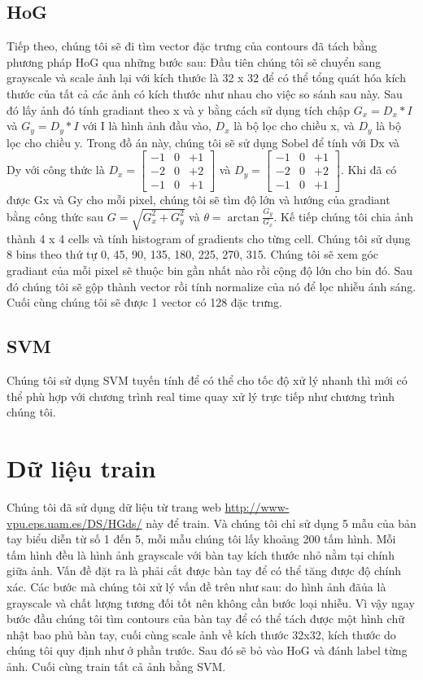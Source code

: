 \documentclass[a4paper, 12pt]{article}
\begin{document}
\subsection{HoG}
Tiếp theo, chúng tôi sẽ đi tìm vector đặc trưng của contours đã tách bằng phương pháp HoG qua những bước sau: Đầu tiên chúng tôi sẽ chuyển sang grayscale và scale ảnh lại với kích thước là 32 x 32 để có thể tổng quát hóa kích thước của tất cả các ảnh có kích thước như nhau cho việc so sánh sau này. Sau đó lấy ảnh đó tính gradiant theo x và y bằng cách sử dụng tích chập $G_{x} = D_{x} * I$ và $G_{y} = D_{y} *I $ với I là hình ảnh đầu vào, $D_{x}$ là bộ lọc cho chiều x, và $D_{y}$ là bộ lọc cho chiều y. Trong đồ án này, chúng tôi sẽ sử dụng Sobel để tính với Dx và Dy với công thức là $D_{x} =  \begin{bmatrix} -1 & 0 & +1 \\ -2 & 0 & +2 \\ -1 & 0 & +1 \end{bmatrix}$ và $D_{y} =  \begin{bmatrix} -1 & 0 & +1 \\ -2 & 0 & +2 \\ -1 & 0 & +1 \end{bmatrix}$. Khi đã có được Gx và Gy cho mỗi pixel, chúng tôi sẽ tìm độ lớn và hướng của gradiant bằng công thức sau $G = \sqrt{G^2_x + G^2_y}$ và $\theta = \arctan \frac{G_y}{G_x}$. Kế tiếp chúng tôi chia ảnh thành 4 x 4 cells và tính histogram of gradients cho từng cell. Chúng tôi sử dụng 8 bins theo thứ tự 0, 45, 90, 135, 180, 225, 270, 315. Chúng tôi sẽ xem góc gradiant của mỗi pixel sẽ thuộc bin gần nhất nào rồi cộng độ lớn cho bin đó. Sau đó chúng tôi sẽ gộp thành vector rồi tính normalize của nó để lọc nhiễu ánh sáng. Cuối cùng chúng tôi sẽ được 1 vector có 128 đặc trưng.

\subsection{SVM}
Chúng tôi sử dụng SVM tuyến tính để có thể cho tốc độ xử lý nhanh thì mới có thể phù hợp với chương trình real time quay xử lý trực tiếp như chương trình chúng tôi. 
\section{Dữ liệu train}
Chúng tôi đã sử dụng dữ liệu từ trang web \url{http://www-vpu.eps.uam.es/DS/HGds/} này để train. Và chúng tôi chỉ sử dụng 5 mẫu của bản tay biểu diễn từ số 1 đến 5, mỗi mẫu chúng tôi lấy khoảng 200 tấm hình. Mỗi tấm hình đều là hình ảnh grayscale với bàn tay kích thước nhỏ nằm tại chính giữa ảnh. Vấn đề đặt ra là phải cắt được bàn tay để có thể tăng được độ chính xác. Các bước mà chúng tôi xử lý vấn đề trên như sau: do hình ảnh đãủa là grayscale và chất lượng tương đối tốt nên không cần bước loại nhiễu. Vì vậy ngay bước đầu chúng tôi tìm contours của bàn tay để có thể tách được một hình chữ nhật bao phủ bàn tay, cuối cùng scale ảnh về kích thước 32x32, kích thước do chúng tôi quy định như ở phần trước. Sau đó sẽ bỏ vào HoG và đánh label từng ảnh. Cuối cùng train tất cả ảnh bằng SVM.
\end{document}
